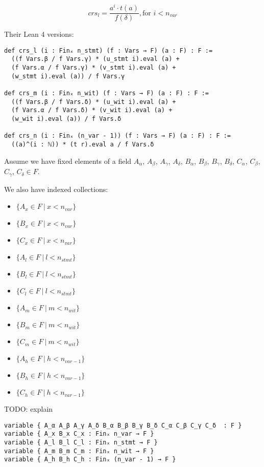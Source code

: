 \documentclass{article}
\theoremstyle{definition}
\theoremstyle{remark}
\begin{document}
\begin{equation}
crs_l = \frac{a^i \cdot t(a)}{f(\delta)}, \text{for $i < n_{var}$}
\end{equation}

Their Lean 4 versions:

\begin{lstlisting}
def crs_l (i : Finₓ n_stmt) (f : Vars → F) (a : F) : F :=
  ((f Vars.β / f Vars.γ) * (u_stmt i).eval (a) +
  (f Vars.α / f Vars.γ) * (v_stmt i).eval (a) +
  (w_stmt i).eval (a)) / f Vars.γ

def crs_m (i : Finₓ n_wit) (f : Vars → F) (a : F) : F :=
  ((f Vars.β / f Vars.δ) * (u_wit i).eval (a) +
  (f Vars.α / f Vars.δ) * (v_wit i).eval (a) +
  (w_wit i).eval (a)) / f Vars.δ

def crs_n (i : Finₓ (n_var - 1)) (f : Vars → F) (a : F) : F :=
  ((a)^(i : ℕ)) * (t r).eval a / f Vars.δ
\end{lstlisting}

Assume we have fixed elements of a field $A_{\alpha}$, $A_{\beta}$, $A_{\gamma}$, $A_{\delta}$, $B_{\alpha}$, $B_{\beta}$, $B_{\gamma}$, $B_{\delta}$, $C_{\alpha}$, $C_{\beta}$, $C_{\gamma}$, $C_{\delta} \in F$.

We also have indexed collections:
\begin{itemize}
\item $\{ A_x \in F \: | \: x < n_{var} \}$
\item $\{ B_x \in F \: | \: x < n_{var} \}$
\item $\{ C_x \in F \: | \: x < n_{var} \}$
\item $\{ A_l \in F \: | \: l < n_{stmt} \}$
\item $\{ B_l \in F \: | \: l < n_{stmt} \}$
\item $\{ C_l \in F \: | \: l < n_{stmt} \}$
\item $\{ A_m \in F \: | \: m < n_{wit} \}$
\item $\{ B_m \in F \: | \: m < n_{wit} \}$
\item $\{ C_m \in F \: | \: m < n_{wit} \}$
\item $\{ A_h \in F \: | \: h < n_{var - 1} \}$
\item $\{ B_h \in F \: | \: h < n_{var - 1} \}$
\item $\{ C_h \in F \: | \: h < n_{var - 1} \}$
\end{itemize}
TODO: explain

\begin{lstlisting}
variable { A_α A_β A_γ A_δ B_α B_β B_γ B_δ C_α C_β C_γ C_δ  : F }
variable { A_x B_x C_x : Finₓ n_var → F }
variable { A_l B_l C_l : Finₓ n_stmt → F }
variable { A_m B_m C_m : Finₓ n_wit → F }
variable { A_h B_h C_h : Finₓ (n_var - 1) → F }
\end{lstlisting}
\end{document}
